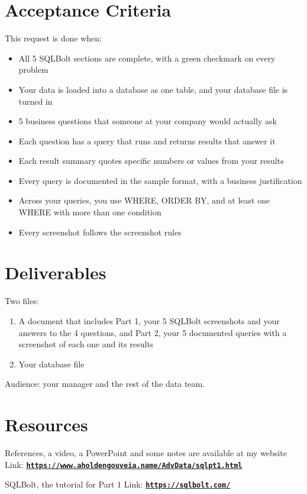 \documentclass[12pt]{article}
\begin{document}
\section*{Acceptance Criteria}
This request is done when:
\begin{itemize}
    \item All 5 SQLBolt sections are complete, with a green checkmark on every problem
    \item Your data is loaded into a database as one table, and your database file is turned in
    \item 5 business questions that someone at your company would actually ask
    \item Each question has a query that runs and returns results that answer it
    \item Each result summary quotes specific numbers or values from your results
    \item Every query is documented in the sample format, with a business justification
    \item Across your queries, you use WHERE, ORDER BY, and at least one WHERE with more than one condition
    \item Every screenshot follows the screenshot rules
\end{itemize}

\section*{Deliverables}
Two files:
\begin{enumerate}
    \item A document that includes Part 1, your 5 SQLBolt screenshots and your answers to the 4 questions, and Part 2, your 5 documented queries with a screenshot of each one and its results
    \item Your database file
\end{enumerate}

Audience: your manager and the rest of the data team.

\section*{Resources}
References, a video, a PowerPoint and some notes are available at my website
Link: \href{https://www.aholdengouveia.name/AdvData/sqlpt1.html}{\textbf{\nolinkurl{https://www.aholdengouveia.name/AdvData/sqlpt1.html}}}

SQLBolt, the tutorial for Part 1
Link: \href{https://sqlbolt.com/}{\textbf{\nolinkurl{https://sqlbolt.com/}}}
\end{document}
